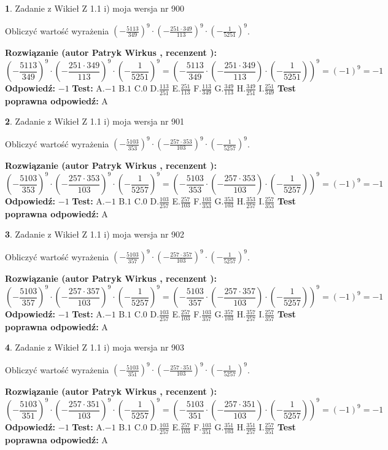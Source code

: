 \documentclass[12pt, a4paper]{article}
\theoremstyle{definition} %
\newtheorem{zad}{}
\newcommand{\zadStart}[1]{\begin{zad}#1\newline}
\newcommand{\zadStop}{\end{zad}}
\newcommand{\rozwStart}[2]{\noindent \textbf{Rozwiązanie (autor #1 , recenzent #2): }\newline}
\newcommand{\rozwStop}{\newline}
\newcommand{\odpStart}{\noindent \textbf{Odpowiedź:}\newline}
\newcommand{\odpStop}{\newline}
\newcommand{\testStart}{\noindent \textbf{Test:}\newline}
\newcommand{\testStop}{\newline}
\newcommand{\kluczStart}{\noindent \textbf{Test poprawna odpowiedź:}\newline}
\newcommand{\kluczStop}{\newline}
\begin{document}
\zadStart{Zadanie z Wikieł Z 1.1 i) moja wersja nr 900}

Obliczyć wartość wyrażenia $(-\frac{5113}{349})^{9} \cdot (-\frac{251 \cdot 349}{113})^{9} \cdot (-\frac{1}{5251})^{9}$.
\zadStop
\rozwStart{Patryk Wirkus}{}
$$(-\frac{5113}{349})^{9} \cdot (-\frac{251 \cdot 349}{113})^{9} \cdot (-\frac{1}{5251})^{9} = (-\frac{5113}{349} \cdot (-\frac{251 \cdot 349}{113}) \cdot (-\frac{1}{5251}))^{9} = (-1)^{9} = -1$$
\rozwStop
\odpStart
$-1$
\odpStop
\testStart
A.$-1$ B.$1$ C.$0$ D.$\frac{113}{251}$ E.$\frac{251}{113}$
F.$\frac{113}{349}$ G.$\frac{349}{113}$
H.$\frac{349}{251}$
I.$\frac{251}{349}$
\testStop
\kluczStart
A
\kluczStop



\zadStart{Zadanie z Wikieł Z 1.1 i) moja wersja nr 901}

Obliczyć wartość wyrażenia $(-\frac{5103}{353})^{9} \cdot (-\frac{257 \cdot 353}{103})^{9} \cdot (-\frac{1}{5257})^{9}$.
\zadStop
\rozwStart{Patryk Wirkus}{}
$$(-\frac{5103}{353})^{9} \cdot (-\frac{257 \cdot 353}{103})^{9} \cdot (-\frac{1}{5257})^{9} = (-\frac{5103}{353} \cdot (-\frac{257 \cdot 353}{103}) \cdot (-\frac{1}{5257}))^{9} = (-1)^{9} = -1$$
\rozwStop
\odpStart
$-1$
\odpStop
\testStart
A.$-1$ B.$1$ C.$0$ D.$\frac{103}{257}$ E.$\frac{257}{103}$
F.$\frac{103}{353}$ G.$\frac{353}{103}$
H.$\frac{353}{257}$
I.$\frac{257}{353}$
\testStop
\kluczStart
A
\kluczStop



\zadStart{Zadanie z Wikieł Z 1.1 i) moja wersja nr 902}

Obliczyć wartość wyrażenia $(-\frac{5103}{357})^{9} \cdot (-\frac{257 \cdot 357}{103})^{9} \cdot (-\frac{1}{5257})^{9}$.
\zadStop
\rozwStart{Patryk Wirkus}{}
$$(-\frac{5103}{357})^{9} \cdot (-\frac{257 \cdot 357}{103})^{9} \cdot (-\frac{1}{5257})^{9} = (-\frac{5103}{357} \cdot (-\frac{257 \cdot 357}{103}) \cdot (-\frac{1}{5257}))^{9} = (-1)^{9} = -1$$
\rozwStop
\odpStart
$-1$
\odpStop
\testStart
A.$-1$ B.$1$ C.$0$ D.$\frac{103}{257}$ E.$\frac{257}{103}$
F.$\frac{103}{357}$ G.$\frac{357}{103}$
H.$\frac{357}{257}$
I.$\frac{257}{357}$
\testStop
\kluczStart
A
\kluczStop



\zadStart{Zadanie z Wikieł Z 1.1 i) moja wersja nr 903}

Obliczyć wartość wyrażenia $(-\frac{5103}{351})^{9} \cdot (-\frac{257 \cdot 351}{103})^{9} \cdot (-\frac{1}{5257})^{9}$.
\zadStop
\rozwStart{Patryk Wirkus}{}
$$(-\frac{5103}{351})^{9} \cdot (-\frac{257 \cdot 351}{103})^{9} \cdot (-\frac{1}{5257})^{9} = (-\frac{5103}{351} \cdot (-\frac{257 \cdot 351}{103}) \cdot (-\frac{1}{5257}))^{9} = (-1)^{9} = -1$$
\rozwStop
\odpStart
$-1$
\odpStop
\testStart
A.$-1$ B.$1$ C.$0$ D.$\frac{103}{257}$ E.$\frac{257}{103}$
F.$\frac{103}{351}$ G.$\frac{351}{103}$
H.$\frac{351}{257}$
I.$\frac{257}{351}$
\testStop
\kluczStart
A
\kluczStop
\end{document}
